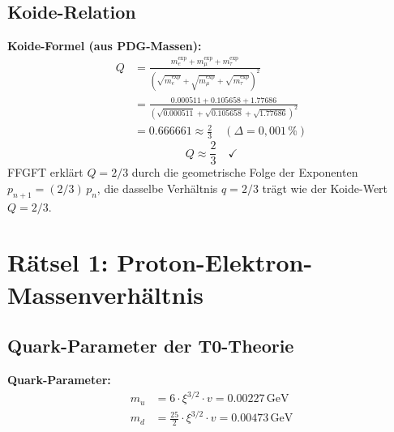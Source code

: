 	\subsection{Koide-Relation}
	\textbf{Koide-Formel (aus PDG-Massen):}
	\begin{align}
		Q &= \frac{m_e^{\text{exp}} + m_\mu^{\text{exp}} + m_\tau^{\text{exp}}}{(\sqrt{m_e^{\text{exp}}} + \sqrt{m_\mu^{\text{exp}}} + \sqrt{m_\tau^{\text{exp}}})^2} \\
		&= \frac{0.000511 + 0.105658 + 1.77686}{(\sqrt{0.000511} + \sqrt{0.105658} + \sqrt{1.77686})^2} \\
		&= 0.666661 \approx \frac{2}{3} \quad (\Delta = 0{,}001\,\%)
	\end{align}
	\begin{equation}
		Q \approx \frac{2}{3} \quad \checkmark
	\end{equation}
	FFGFT erklärt $Q = 2/3$ durch die geometrische Folge der Exponenten
	$p_{n+1} = (2/3)\,p_n$, die dasselbe Verhältnis $q = 2/3$ trägt
	wie der Koide-Wert $Q = 2/3$.
	\section{Rätsel 1: Proton-Elektron-Massenverhältnis}
	\subsection{Quark-Parameter der T0-Theorie}
	\textbf{Quark-Parameter:}
	\begin{align}
		m_u &= 6 \cdot \xi^{3/2} \cdot v = 0.00227\,\si{\giga\electronvolt} \\
		m_d &= \frac{25}{2} \cdot \xi^{3/2} \cdot v = 0.00473\,\si{\giga\electronvolt}
	\end{align}
